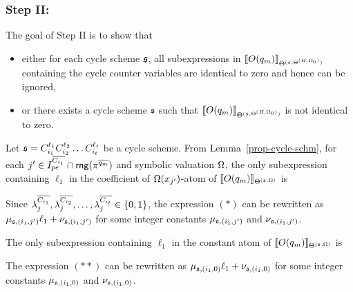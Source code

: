 \subsubsection{Step II:}
The goal of Step II is to show that 
\begin{itemize}
\item either for each cycle scheme ${\mathfrak{s} }$, all subexpressions in $\llbracket O(q_{m})\rrbracket_{\Theta^{({\mathfrak{s} },\Theta^{(H,\Omega_0)})}}$ containing the cycle counter variables are identical to zero and hence can be ignored, 
\item or  there exists a cycle scheme ${\mathfrak{s} }$ such that $\llbracket O(q_{m})\rrbracket_{\Theta^{({\mathfrak{s} },\Theta^{(H,\Omega_0)})}}$ is not identical to zero. 
\end{itemize}
%
Let ${\mathfrak{s} }=C_{i_1}^{\ell_1} C_{i_2}^{\ell_2} \dots C_{i_t}^{\ell_t}$ be a cycle scheme. From Lemma~\ref{prop-cycle-schm}, for each $j'\in I^{\overline{C_{i_1}}}_{pe} \cap \mathsf{rng}(\pi^{\overline{q_m}})$ and symbolic valuation $\Omega$, the only subexpression containing $\ell_1$ in the coefficient of $\Omega(x_{j'})$-atom of $\llbracket O(q_{m})\rrbracket_{\Theta^{({\mathfrak{s} },\Omega)}}$ is
\begin{center}
\end{center}
Since $\lambda^{\overline{C_{i_1}}}_{j}, \lambda^{\overline{C_{i_2}}}_{j}, \dots, \lambda^{\overline{C_{i_t}}}_{j} \in \{0, 1\}$, the expression $(\ast)$  can be rewritten as  
 $\mu_{{\mathfrak{s} }, (i_1,j')} \ell_1 + \nu_{{\mathfrak{s} }, (i_1,j')}$ for some integer constants $\mu_{{\mathfrak{s} }, (i_1,j')}$ and $\nu_{{\mathfrak{s} }, (i_1,j')}$. 
 
The only subexpression containing $\ell_1$ in the constant atom of  $\llbracket O(q_{m})\rrbracket_{\Theta^{({\mathfrak{s} },\Omega)}}$ is
\begin{center}
\end{center}
%
The expression $(\ast\ast)$ can be rewritten as $\mu_{{\mathfrak{s} },(i_1,0)} \ell_1 + \nu_{{\mathfrak{s} },(i_1,0)}$ for some integer constants $\mu_{{\mathfrak{s} }, (i_1,0)}$ and $\nu_{{\mathfrak{s} }, (i_1,0)}$. 

